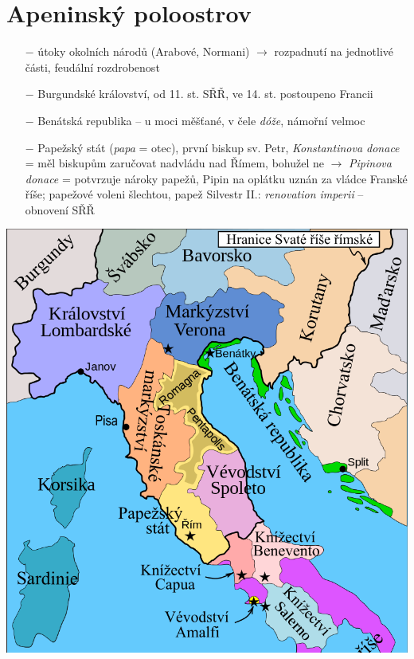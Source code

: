 \documentclass{article}
\begin{document}
\section*{Apeninský poloostrov}
\begin{minipage}{0.6\textwidth}\raggedleft
    \begin{itemize}
        \vspace{-0.5em}
        \setlength\itemsep{0.15em}
        \item[$-$] útoky okolních národů (Arabové, Normani) $\rightarrow$ rozpadnutí na jednotlivé části, feudální rozdrobenost
        \item[$-$] Burgundské království, od 11. st. SŘŘ, ve 14. st. postoupeno Francii
        \item[$-$] Benátská republika -- u moci měšťané, v čele \textit{dóže}, námořní velmoc
        \item[$-$] Papežský stát (\textit{papa} = otec), první biskup sv. Petr, \textit{Konstantinova donace} = měl biskupům zaručovat nadvládu nad Římem, bohužel ne $\rightarrow$ \textit{Pipinova donace} = potvrzuje nároky papežů, Pipin na oplátku uznán za vládce Franské říše; papežové voleni šlechtou, papež Silvestr II.: \textit{renovation imperii} -- obnovení SŘŘ
    \end{itemize}
\end{minipage}
\hfill
\noindent\begin{minipage}{0.3\textwidth}
    \vspace{-3em}
    \includegraphics[width=\linewidth]{ap_pol.png}
\end{minipage}
\end{document}

